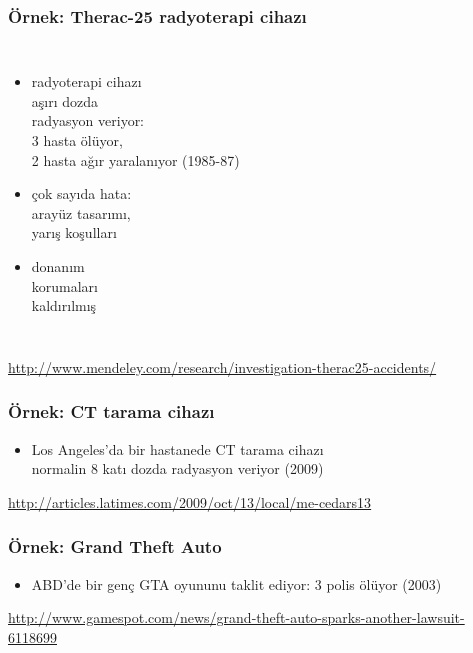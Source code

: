 \documentclass[dvipsnames]{beamer}
\theoremstyle{plain}
\begin{document}
\begin{frame}
  \frametitle{Örnek: Therac-25 radyoterapi cihazı}

  \begin{columns}

    \begin{itemize}
      \item radyoterapi cihazı\\
        aşırı dozda\\
        radyasyon veriyor:\\
        3 hasta ölüyor,\\
        2 hasta ağır yaralanıyor (1985-87)

      \item çok sayıda hata:\\
        arayüz tasarımı,\\
        yarış koşulları
      \item donanım\\
        korumaları\\
        kaldırılmış
    \end{itemize}
  \end{columns}

  \medskip
  \tiny{\url{http://www.mendeley.com/research/investigation-therac25-accidents/}}\\
\end{frame}

\begin{frame}
  \frametitle{Örnek: CT tarama cihazı}

  \begin{center}
  \end{center}

  \begin{itemize}
    \item Los Angeles'da bir hastanede CT tarama cihazı\\
      normalin 8 katı dozda radyasyon veriyor (2009)
  \end{itemize}

  \medskip
  \tiny{\url{http://articles.latimes.com/2009/oct/13/local/me-cedars13}}\\
\end{frame}

\begin{frame}
  \frametitle{Örnek: Grand Theft Auto}

  \begin{center}
  \end{center}

  \begin{itemize}
    \item ABD'de bir genç GTA oyununu taklit ediyor: 3 polis ölüyor (2003)
  \end{itemize}

  \medskip
  \tiny{\url{http://www.gamespot.com/news/grand-theft-auto-sparks-another-lawsuit-6118699}}\\
\end{frame}
\end{document}
